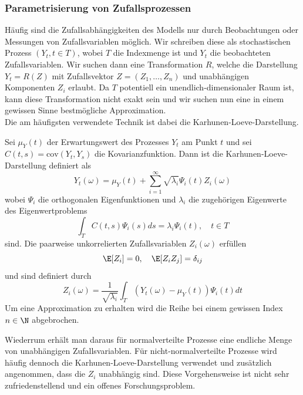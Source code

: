 \subsubsection{Parametrisierung von Zufallsprozessen}
Häufig sind die Zufallsabhängigkeiten des Modells nur durch Beobachtungen oder Messungen von Zufallsvariablen möglich. Wir schreiben diese als stochastischen Prozess $(Y_t,t\in T)$, wobei $T$ die Indexmenge ist und $Y_t$ die beobachteten Zufallsvariablen. Wir suchen dann eine Transformation $R$, welche die Darstellung $Y_t=R(Z)$ mit Zufallsvektor $Z=(Z_1,\dots,Z_n)$ und unabhängigen Komponenten $Z_i$ erlaubt. Da $T$ potentiell ein unendlich-dimensionaler Raum ist, kann diese Transformation nicht exakt sein und wir suchen nun eine in einem gewissen Sinne bestmögliche Approximation.\\
Die am häufigsten verwendete Technik ist dabei die Karhunen-Loeve-Darstellung.
\begin{mathdef}
Sei $\mu_Y(t)$ der Erwartungswert des Prozesses $Y_t$ am Punkt $t$ und sei $C(t,s)=\text{cov}(Y_t,Y_s)$ die Kovarianzfunktion. Dann ist die Karhunen-Loeve-Darstellung definiert als
\[Y_t(\omega)=\mu_Y(t)+\sum_{i=1}^\infty \sqrt{\lambda_i}\Psi_i(t)Z_i(\omega)\] wobei $\Psi_i$ die orthogonalen Eigenfunktionen und $\lambda_i$ die zugehörigen Eigenwerte des Eigenwertproblems
\[\int_T C(t,s)\Psi_i(s)ds=\lambda_i\Psi_i(t),\quad t\in T\]
sind. Die paarweise unkorrelierten Zufallsvariablen $Z_i(\omega)$ erfüllen
\[\E[Z_i]=0,\quad \E[Z_iZ_j]=\delta_{ij}\]
und sind definiert durch
\[Z_i(\omega)=\frac{1}{\sqrt{\lambda_i}}\int_T (Y_t(\omega)-\mu_Y(t))\Psi_i(t)dt\]
Um eine Approximation zu erhalten wird die Reihe bei einem gewissen Index $n\in\N$ abgebrochen.
\end{mathdef}
Wiederrum erhält man daraus für normalverteilte Prozesse eine endliche Menge von unabhängigen Zufallsvariablen. Für nicht-normalverteilte Prozesse wird häufig dennoch die Karhunen-Loeve-Darstellung verwendet und zusätzlich angenommen, dass die $Z_i$ unabhängig sind. Diese Vorgehensweise ist nicht sehr zufriedenstellend und ein offenes Forschungsproblem.

